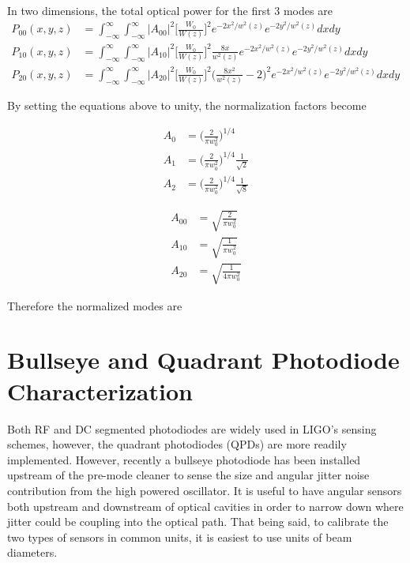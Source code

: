 \begin{appendices}
	In two dimensions, the total optical power for the first 3 modes are
	\begin{equation}
	\label{HGNormalInt2D}
	\begin{aligned}
		P_{00}(x,y,z) 	& 	=	 \int_{-\infty}^{\infty} \int_{-\infty}^{\infty}  \vert A_{00} \vert^2   \bigg[ \frac{W_0}{W(z)} \bigg]^2 e^{-2x^2/w^2(z)}e^{-2y^2/w^2(z)} dx dy&
	\\	P_{10}(x,y,z)	&	=	\int_{-\infty}^{\infty} \int_{-\infty}^{\infty}  \vert A_{10} \vert^2  \bigg[ \frac{W_0}{W(z)} \bigg]^2 \frac{8x}{w^2(z)} e^{-2x^2/w^2(z)}e^{-2y^2/w^2(z)} dx dy&
	\\	P_{20}(x,y,z)	&	= 	\int_{-\infty}^{\infty} \int_{-\infty}^{\infty}  \vert A_{20} \vert^2   \bigg[ \frac{W_0}{W(z)} \bigg]^2 \bigg(\frac{8x^2}{w^2(z)} - 2\bigg)^2 e^{-2x^2/w^2(z)}e^{-2y^2/w^2(z)} dx dy
	\end{aligned}
	\end{equation}
	
	By setting the equations above to unity, the normalization factors become
	
	\begin{equation}
	\begin{aligned}
		A_{0} &	= \bigg( \frac{2}{\pi w_0^2} \bigg)^{1/4} 
	\\	A_{1} &	= \bigg( \frac{2}{\pi w_0^2} \bigg)^{1/4} \frac{1}{\sqrt{2}}
	\\	A_{2} &	= \bigg( \frac{2}{\pi w_0^2} \bigg)^{1/4} \frac{1}{\sqrt{8}}
	\end{aligned}
	\end{equation}
	
	\begin{equation}
	\begin{aligned}
		A_{00} &	= \sqrt{\frac{2}{\pi w_0^2}}
	\\	A_{10} &	= \sqrt{\frac{1}{\pi w_0^2}}
	\\	A_{20} &	= \sqrt{\frac{1}{4\pi w_0^2}}
	\end{aligned}
	\end{equation}
	
	Therefore the normalized modes are
	

	
	\chapter{Bullseye and Quadrant Photodiode Characterization}\label{BPDchar}
	Both RF and DC segmented photodiodes are widely used in LIGO's sensing schemes, however, the quadrant photodiodes (QPDs) are more readily implemented.  However, recently a bullseye photodiode has been installed upstream of the pre-mode cleaner to sense the size and angular jitter noise contribution from the high powered oscillator.  It is useful to have angular sensors both upstream and downstream of optical cavities in order to narrow down where jitter could be coupling into the optical path.  That being said, to calibrate the two types of sensors in common units, it is easiest to use units of beam diameters.

\end{appendices}
